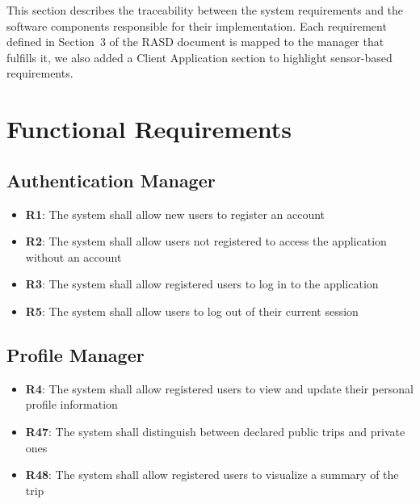 This section describes the traceability between the system requirements and the software components responsible for their implementation. Each requirement defined in Section~3 of the RASD document is mapped to the manager that fulfills it, we also added a Client Application section to highlight sensor-based requirements.

\section{Functional Requirements}
\subsection*{Authentication Manager}
\begin{itemize}
	\item \textbf{R1}: The system shall allow new users to register an account
	\item \textbf{R2}: The system shall allow users not registered to access the application without an account
	\item \textbf{R3}: The system shall allow registered users to log in to the application
	\item \textbf{R5}: The system shall allow users to log out of their current session
\end{itemize}

\subsection*{Profile Manager}
\begin{itemize}
	\item \textbf{R4}: The system shall allow registered users to view and update their personal profile information
	\item \textbf{R47}: The system shall distinguish between declared public trips and private ones
	\item \textbf{R48}: The system shall allow registered users to visualize a summary of the trip
\end{itemize}

